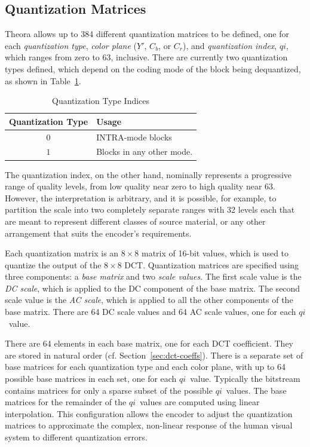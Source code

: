 \documentclass[9pt,letterpaper]{book}
\newcommand{\idx}[1]{{\ensuremath{\mathit{#1}}}}
\newcommand{\qi}{\idx{qi}}
\newcommand{\term}[1]{{\em #1}}
\numberwithin{equation}{chapter}
\numberwithin{figure}{chapter}
\numberwithin{table}{chapter}
\begin{document}
\subsection{Quantization Matrices}

Theora allows up to 384 different quantization matrices to be defined, one for
 each \term{quantization type}, \term{color plane} ($Y'$, $C_b$, or $C_r$), and
 \term{quantization index}, \qi, which ranges from zero to 63, inclusive.
There are currently two quantization types defined, which depend on the coding
 mode of the block being dequantized, as shown in Table~\ref{tab:quant-types}.

\begin{table}[htbp]
\begin{center}
\begin{tabular}{cl}\toprule
Quantization Type & Usage                     \\\midrule
$0$               & INTRA-mode blocks         \\
$1$               & Blocks in any other mode. \\
\bottomrule\end{tabular}
\end{center}
\caption{Quantization Type Indices}
\label{tab:quant-types}
\end{table}

The quantization index, on the other hand, nominally represents a progressive
 range of quality levels, from low quality near zero to high quality near 63.
However, the interpretation is arbitrary, and it is possible, for example, to
 partition the scale into two completely separate ranges with 32 levels each
 that are meant to represent different classes of source material, or any
 other arrangement that suits the encoder's requirements.

Each quantization matrix is an $8\times 8$ matrix of 16-bit values, which is
 used to quantize the output of the $8\times 8$ DCT\@.
Quantization matrices are specified using three components: a
 \term{base matrix} and two \term{scale values}.
The first scale value is the \term{DC scale}, which is applied to the DC
 component of the base matrix.
The second scale value is the \term{AC scale}, which is applied to all the
 other components of the base matrix.
There are 64 DC scale values and 64 AC scale values, one for each \qi\ value.

There are 64 elements in each base matrix, one for each DCT coefficient.
They are stored in natural order (cf. Section~\ref{sec:dct-coeffs}).
There is a separate set of base matrices for each quantization type and each
 color plane, with up to 64 possible base matrices in each set, one for each
 \qi\ value.
Typically the bitstream contains matrices for only a sparse subset of the
 possible \qi\ values.
The base matrices for the remainder of the \qi\ values are computed using
 linear interpolation.
This configuration allows the encoder to adjust the quantization matrices to
 approximate the complex, non-linear response of the human visual system to
 different quantization errors.
\end{document}
